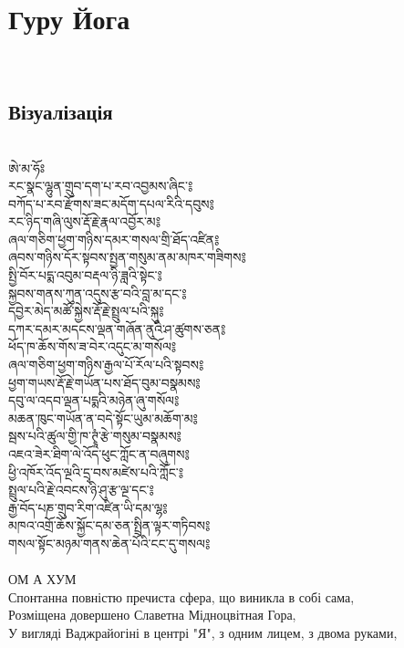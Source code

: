 \section{Гуру Йога}
\\
\subsection{Візуалізація}
\\
\ti
ཨེ་མ་ཧོཿ \\
རང་སྣང་ལྷུན་གྲུབ་དག་པ་རབ་འབྱམས་ཞིང་༔ \\
བཀོད་པ་རབ་རྫོགས་ཟང་མདོག་དཔལ་རིའི་དབུས༔\\
རང་ཉིད་གཞི་ལུས་རྡོ་རྗེ་རྣལ་འབྱོར་མ༔\\
ཞལ་གཅིག་ཕྱག་གཉིས་དམར་གསལ་གྲི་ཐོད་འཛིན༔\\
ཞབས་གཉིས་དོར་སྟབས་སྤྱན་གསུམ་ནམ་མཁར་གཟིགས༔\\
སྤྱི་བོར་པདྨ་འབུམ་བརྡལ་ཉི་ཟླའི་སྟེང་༔\\
སྐྱབས་གནས་ཀུན་འདུས་རྩ་བའི་བླ་མ་དང་༔\\
དབྱེར་མེད་མཚོ་སྐྱེས་རྡོ་རྗེ་སྤྲུལ་པའི་སྐུ༔\\
དཀར་དམར་མདངས་ལྡན་གཞོན་ནུའི་ཤ་ཚུགས་ཅན༔\\
ཕོད་ཁ་ཆོས་གོས་ཟ་བེར་འདུང་མ་གསོལ༔\\
ཞལ་གཅིག་ཕྱག་གཉིས་རྒྱལ་པོ་རོལ་པའི་སྟབས༔\\
ཕྱག་གཡས་རྡོ་རྗེ་གཡོན་པས་ཐོད་བུམ་བསྣམས༔\\
དབུ་ལ་འདབ་ལྡན་པདྨའི་མཉེན་ཞུ་གསོལ༔\\
མཆན་ཁུང་གཡོན་ན་བདེ་སྟོང་ཡུམ་མཆོག་མ༔\\
སྦས་པའི་ཚུལ་གྱི་ཁ་ཊྭཱཾ་རྩེ་གསུམ་བསྣམས༔\\
འཇའ་ཟེར་ཐིག་ལེ་འོད་ཕུང་ཀློང་ན་བཞུགས༔\\
ཕྱི་འཁོར་འོད་ལྔའི་དྲྭ་བས་མཛེས་པའི་ཀློང་༔\\
སྤྲུལ་པའི་རྗེ་འབངས་ཉི་ཤུ་རྩ་ལྔ་དང་༔\\
རྒྱ་བོད་པཎ་གྲུབ་རིག་འཛིན་ཡི་དམ་ལྷ༔\\
མཁའ་འགྲོ་ཆོས་སྐྱོང་དམ་ཅན་སྤྲིན་ལྟར་གཏིབས༔\\
གསལ་སྟོང་མཉམ་གནས་ཆེན་པོའི་ངང་དུ་གསལ༔\\
\ru
\newpage
\\
ОМ А ХУМ\\
Спонтанна повністю пречиста сфера, що виникла в собі сама,\\
Розміщена довершено Славетна Мідноцвітная Гора,\\
У вигляді Ваджрайогіні в центрі "Я", з одним лицем, з двома руками,\\
